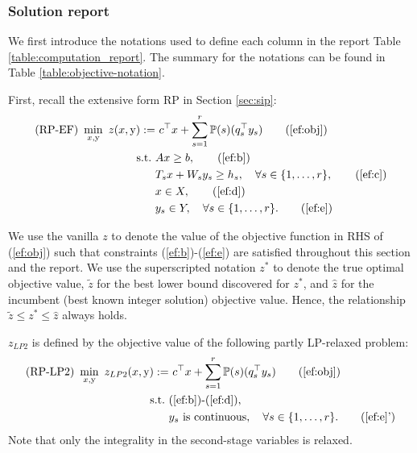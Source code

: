 \subsubsection{Solution report}
We first introduce the notations used to define each column in the report Table \ref{table:computation_report}. The summary for the notations can be found in Table \ref{table:objective-notation}.

First, recall the extensive form RP in Section \ref{sec:sip}:
\begin{subequations}\label{ef}
	\begin{align}
	\textrm{(RP-EF) }\min_{x,\mathrm{y}}\ z(x,\mathrm{y}):=&\ c^{\top}x + \sum_{s=1}^{r}\PP(s) (q_s^{\top}y_s) \tag{\ref{ef:obj}}\\ 
	\mathrm{s.t.}\ &Ax\ge b,  \tag{\ref{ef:b}}\\
	&T_s x+W_s y_s\ge h_s,\quad\forall s\in\{1,\ldots,r\}, \tag{\ref{ef:c}} \\
	&x\in X, \tag{\ref{ef:d}} \\
	&y_s \in Y,\quad\forall s\in\{1,\ldots,r\}. \tag{\ref{ef:e}}
	\end{align}
\end{subequations}

We use the vanilla $z$ to denote the value of the objective function in RHS of (\ref{ef:obj}) such that constraints (\ref{ef:b})-(\ref{ef:e}) are satisfied throughout this section and the report. We use the superscripted notation $z^*$ to denote the true optimal objective value, $\tilde{z}$ for the best lower bound discovered for $z^*$, and $\hat{z}$ for the incumbent (best known integer solution) objective value. Hence, the relationship $\tilde{z}\le z^*\le\hat{z}$ always holds.

$z_{LP2}$ is defined by the objective value of the following partly LP-relaxed problem:
\begin{subequations}\label{ef-lp2}
	\begin{align}
	\textrm{(RP-LP2) }\min_{x,\mathrm{y}}\ z_{LP2}(x,\mathrm{y}):=&\ c^{\top}x + \sum_{s=1}^{r}\PP(s) (q_s^{\top}y_s) \tag{\ref{ef:obj}}\\ 
	\mathrm{s.t.}\ &\textrm{(\ref{ef:b})-(\ref{ef:d})}, \nonumber \\
	& y_s \textrm{ is continuous} ,\quad\forall s\in\{1,\ldots,r\}. \tag{\ref{ef:e}'}
	\end{align}
\end{subequations}
Note that only the integrality in the second-stage variables is relaxed.

